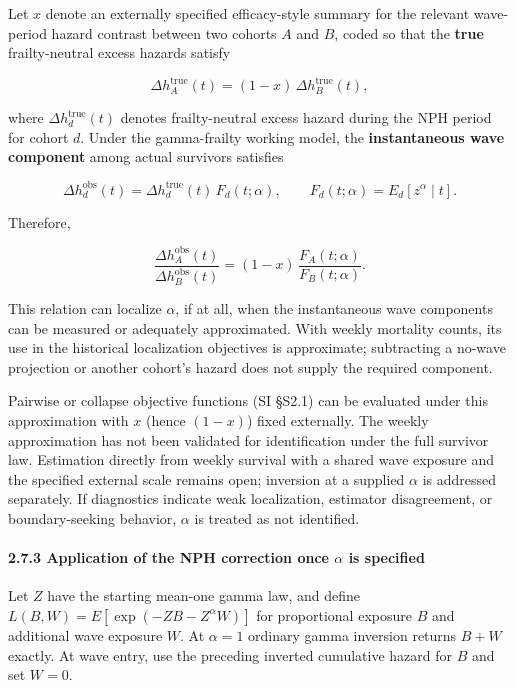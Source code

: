 \documentclass[
]{article}
\begin{document}
Let \(x\) denote an externally specified efficacy-style summary for the relevant wave-period hazard contrast between two cohorts \(A\) and \(B\), coded so that the \textbf{true} frailty-neutral excess hazards satisfy

\[\Delta h_A^{\mathrm{true}}(t) = (1-x)\,\Delta h_B^{\mathrm{true}}(t),\]

where \(\Delta h_d^{\mathrm{true}}(t)\) denotes frailty-neutral excess hazard during the NPH period for cohort \(d\). Under the gamma-frailty working model, the \textbf{instantaneous wave component} among actual survivors satisfies

\[\Delta h_d^{\mathrm{obs}}(t)=\Delta h_d^{\mathrm{true}}(t)\,F_d(t;\alpha),
\qquad
F_d(t;\alpha)=E_d[z^{\alpha}\mid t].\]

Therefore,

\[\frac{\Delta h_A^{\mathrm{obs}}(t)}{\Delta h_B^{\mathrm{obs}}(t)}
=
(1-x)\,\frac{F_A(t;\alpha)}{F_B(t;\alpha)}.\]

This relation can localize \(\alpha\), if at all, when the instantaneous wave components can be measured or adequately approximated. With weekly mortality counts, its use in the historical localization objectives is approximate; subtracting a no-wave projection or another cohort's hazard does not supply the required component.

Pairwise or collapse objective functions (SI §S2.1) can be evaluated under this approximation with \(x\) (hence \((1-x)\)) fixed externally. The weekly approximation has not been validated for identification under the full survivor law. Estimation directly from weekly survival with a shared wave exposure and the specified external scale remains open; inversion at a supplied \(\alpha\) is addressed separately. If diagnostics indicate weak localization, estimator disagreement, or boundary-seeking behavior, \(\alpha\) is treated as not identified.

\paragraph{\texorpdfstring{2.7.3 Application of the NPH correction once \(\alpha\) is specified}{2.7.3 Application of the NPH correction once \textbackslash alpha is specified}}\label{application-of-the-nph-correction-once-alpha-is-specified}

Let \(Z\) have the starting mean-one gamma law, and define \(L(B,W)=E[\exp(-ZB-Z^\alpha W)]\) for proportional exposure \(B\) and additional wave exposure \(W\). At \(\alpha=1\) ordinary gamma inversion returns \(B+W\) exactly. At wave entry, use the preceding inverted cumulative hazard for \(B\) and set \(W=0\).
\end{document}
